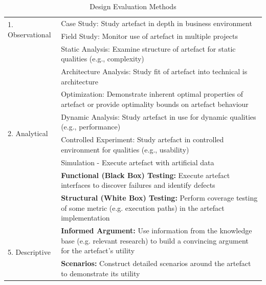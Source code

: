 \begin{table}[h]
	\begin{center}
		\begin{tabular}{ | m{4cm} | p{10cm} | } 
			\hline
			\multirow{2}{*}{1. Observational} &
			Case Study: Study artefact in depth in business environment \\
			\cline{2-2}
			& Field Study: Monitor use of artefact in multiple projects \\
			\hline
			\multirow{8}{*}{2. Analytical} &
			Static Analysis: Examine structure of artefact for static qualities (e.g., complexity) \\
			\cline{2-2}
			& Architecture Analysis: Study fit of artefact into technical \gls{is} architecture \\
			\cline{2-2}
			& Optimization: Demonstrate inherent optimal properties of artefact or provide optimality bounds on artefact behaviour \\
			\cline{2-2}
			& Dynamic Analysis: Study artefact in use for dynamic qualities (e.g., performance) \\
			\hline
			\multirow{3}{*}{3. Experimental} &
			Controlled Experiment: Study artefact in controlled environment for qualities (e.g., usability) \\
			\cline{2-2}
			& Simulation - Execute artefact with artificial data \\
			\hline
			\multirow{5}{*}{4. Testing} &
			\cellcolor{green!25}\textbf{Functional (Black Box) Testing:} Execute artefact interfaces to discover failures and identify defects \\
			\hhline{|~|-|}
			& \cellcolor{green!25}\textbf{Structural (White Box) Testing:} Perform coverage testing of some metric (e.g. execution paths) in the artefact implementation \\
			\hline
			\multirow{5}{*}{5. Descriptive} &
			\cellcolor{green!25}\textbf{Informed Argument:} Use information from the knowledge base (e.g. relevant research) to build a convincing argument for the artefact's utility \\
			\hhline{|~|-|}
			& \cellcolor{green!25}\textbf{Scenarios:} Construct detailed scenarios around the artefact to demonstrate its utility \\
			\hline
		\end{tabular}
		\caption[Design Evaluation Methods]{Design Evaluation Methods \citep[based on][]{Hevner2004}}
		\label{tbl:designevaluationmethods}
	\end{center}
\end{table}


